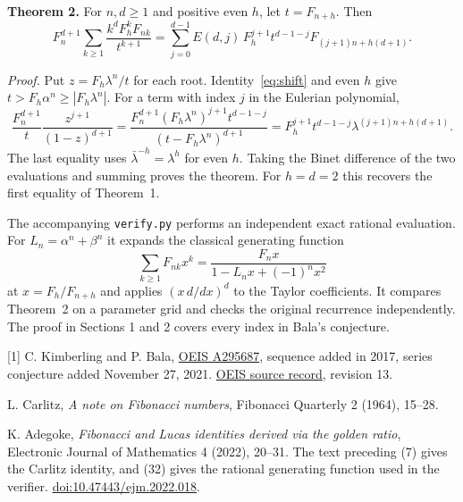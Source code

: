 \documentclass[11pt,letterpaper]{article}
\newcommand{\hd}[1]{\vspace{4pt}{\large\bfseries\color{accent}#1}\par}
\begin{document}
\textbf{Theorem 2.} For $n,d\ge1$ and positive even $h$, let $t=F_{n+h}$. Then
\[
 F_n^{d+1}\sum_{k\ge1}\frac{k^d F_h^k F_{nk}}{t^{k+1}}
 =\sum_{j=0}^{d-1} E(d,j)\,F_h^{j+1}t^{d-1-j}
                  F_{(j+1)n+h(d+1)}.
\]

\textit{Proof.} Put $z=F_h\lambda^n/t$ for each root. Identity~\eqref{eq:shift} and even $h$ give $t>F_h\alpha^n\ge |F_h\lambda^n|$. For a term with index $j$ in the Eulerian polynomial,
\[
 \frac{F_n^{d+1}}{t}\frac{z^{j+1}}{(1-z)^{d+1}}
 =\frac{F_n^{d+1}(F_h\lambda^n)^{j+1}t^{d-1-j}}{(t-F_h\lambda^n)^{d+1}}
 =F_h^{j+1}t^{d-1-j}\lambda^{(j+1)n+h(d+1)}.
\]
The last equality uses $\bar\lambda^{-h}=\lambda^h$ for even $h$. Taking the Binet difference of the two evaluations and summing proves the theorem. For $h=d=2$ this recovers the first equality of Theorem~1.

\hd{Verification and sources}
The accompanying \texttt{verify.py} performs an independent exact rational evaluation. For $L_n=\alpha^n+\beta^n$ it expands the classical generating function
\[
 \sum_{k\ge1}F_{nk}x^k=\frac{F_n x}{1-L_n x+(-1)^n x^2}
\]
at $x=F_h/F_{n+h}$ and applies $(x\,d/dx)^d$ to the Taylor coefficients. It compares Theorem~2 on a parameter grid and checks the original recurrence independently. The proof in Sections 1 and 2 covers every index in Bala's conjecture.

{\small
[1] C. Kimberling and P. Bala, \href{https://oeis.org/A295687}{OEIS A295687}, sequence added in 2017, series conjecture added November 27, 2021. \href{https://github.com/oeis/oeisdata/blob/main/seq/A295/A295687.seq}{OEIS source record}, revision 13.\par
[2] L. Carlitz, \emph{A note on Fibonacci numbers}, Fibonacci Quarterly 2 (1964), 15--28.\par
[3] K. Adegoke, \emph{Fibonacci and Lucas identities derived via the golden ratio}, Electronic Journal of Mathematics 4 (2022), 20--31. The text preceding (7) gives the Carlitz identity, and (32) gives the rational generating function used in the verifier. \href{https://doi.org/10.47443/ejm.2022.018}{doi:10.47443/ejm.2022.018}.}
\end{document}
